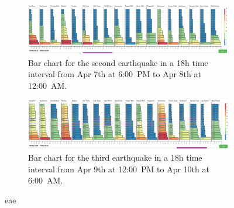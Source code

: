 \begin{figure}[!h]
    \centering
    \begin{subfigure}[!h]{0.98\textwidth}
        \centering
        \includegraphics[width=1.00\textwidth]{figs/q2/eq_2_hbar.png}
        \caption{Bar chart for the second earthquake in a 18h time interval from
        Apr 7th at 6:00~PM to Apr 8th at 12:00~AM.}
        \label{fig:eq_2_hbar}
    \end{subfigure}
    \begin{subfigure}[!h]{0.98\textwidth}
        \centering
        \includegraphics[width=1.00\textwidth]{figs/q2/eq_3_hbar.png}
        \caption{Bar chart for the third earthquake in a 18h time interval from
        Apr 9th at 12:00~PM to Apr 10th at 6:00~AM.}
        \label{fig:eq_3_hbar}
    \end{subfigure}
    \caption{eae}
    \label{fig:eq_2_3_hbar}
\end{figure}

